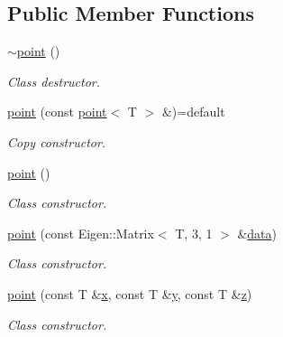 \subsection*{Public Member Functions}
\begin{DoxyCompactItemize}
\item 
\mbox{\label{classddd_1_1point_ab946d459bb160ea06b49c10c3d0dac65}} 
\hyperlink{classddd_1_1point_ab946d459bb160ea06b49c10c3d0dac65}{$\sim$point} ()
\begin{DoxyCompactList}\small\item\em Class destructor. \end{DoxyCompactList}\item 
\mbox{\label{classddd_1_1point_a09fb0691923b2dad58f9e5e2eb89bc9c}} 
\hyperlink{classddd_1_1point_a09fb0691923b2dad58f9e5e2eb89bc9c}{point} (const \hyperlink{classddd_1_1point}{point}$<$ T $>$ \&)=default
\begin{DoxyCompactList}\small\item\em Copy constructor. \end{DoxyCompactList}\item 
\mbox{\label{classddd_1_1point_a38a912e04a5429e7416bea414482a5a5}} 
\hyperlink{classddd_1_1point_a38a912e04a5429e7416bea414482a5a5}{point} ()
\begin{DoxyCompactList}\small\item\em Class constructor. \end{DoxyCompactList}\item 
\hyperlink{classddd_1_1point_a0146118d518509e9e7cdf4fb6733eb48}{point} (const Eigen\+::\+Matrix$<$ T, 3, 1 $>$ \&\hyperlink{classddd_1_1row_object_a30e3d89f19ec4001c9e70d0faaa6c579}{data})
\begin{DoxyCompactList}\small\item\em Class constructor. \end{DoxyCompactList}\item 
\hyperlink{classddd_1_1point_a1f05ca364672341087e1a22b2298d649}{point} (const T \&\hyperlink{classddd_1_1row_object_a29439db5bbde399481c341cb66b7973e}{x}, const T \&\hyperlink{classddd_1_1row_object_adac0d72ea44ad43b82f47b7a26010e4e}{y}, const T \&\hyperlink{classddd_1_1row_object_a8d1d3c3217a0ac951f90e39d980faef4}{z})
\begin{DoxyCompactList}\small\item\em Class constructor. \end{DoxyCompactList}\item 

\end{DoxyCompactItemize}
